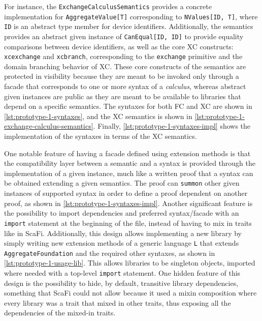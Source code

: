For instance, the \texttt{ExchangeCalculusSemantics} provides a concrete implementation for \texttt{AggregateValue[T]} corresponding to \texttt{NValues[ID, T]}, where \texttt{ID} is an abstract type member for device identifiers.
%
Additionally, the semantics provides an abstract given instance of \texttt{CanEqual[ID, ID]} to provide equality comparisons between device identifiers, as well as the core \ac{XC} constructs: \texttt{xcexchange} and \texttt{xcbranch}, corresponding to the \texttt{exchange} primitive and the domain branching behavior of \ac{XC}.
%
These core constructs of the semantics are protected in visibility because they are meant to be invoked only through a facade that corresponds to one or more syntax of a \textit{calculus}, whereas abstract given instances are public as they are meant to be available to libraries that depend on a specific semantics.
%
The syntaxes for both \ac{FC} and \ac{XC} are shown in \cref{lst:prototype-1-syntaxes}, and the \ac{XC} semantics is shown in \cref{lst:prototype-1-exchange-calculus-semantics}.
%
Finally, \cref{lst:prototype-1-syntaxes-impl} shows the implementation of the syntaxes in terms of the \ac{XC} semantics.

One notable feature of having a facade defined using extension methods is that the compatibility layer between a semantic and a syntax is provided through the implementation of a given instance, much like a written proof that a syntax can be obtained extending a given semantics.
%
The proof can \texttt{summon} other given instances of supported syntax in order to define a proof dependent on another proof, as shown in \cref{lst:prototype-1-syntaxes-impl}.
%
Another significant feature is the possibility to import dependencies and preferred syntax/facade with an \texttt{import} statement at the beginning of the file, instead of having to mix in traits like in ScaFi.
%
Additionally, this design allows implementing a new library by simply writing new extension methods of a generic language \texttt{L} that extends \texttt{AggregateFoundation} and the required other syntaxes, as shown in \cref{lst:prototype-1-usage-lib}.
%
This allows libraries to be singleton objects, imported where needed with a top-level \texttt{import} statement.
%
One hidden feature of this design is the possibility to hide, by default, transitive library dependencies, something that ScaFi could not allow because it used a mixin composition where every library was a trait that mixed in other traits, thus exposing all the dependencies of the mixed-in traits.

